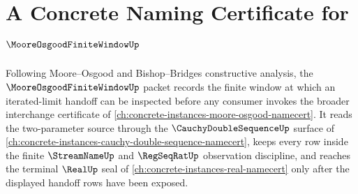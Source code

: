 \chapter{A Concrete Naming Certificate for $\MooreOsgoodFiniteWindowUp$}
\label{ch:concrete-instances-moore-osgood-finite-window-namecert}

Following Moore--Osgood and Bishop--Bridges constructive analysis, the $\MooreOsgoodFiniteWindowUp$ packet records the finite window at which an iterated-limit handoff can be inspected before any consumer invokes the broader interchange certificate of \autoref{ch:concrete-instances-moore-osgood-namecert}. It reads the two-parameter source through the $\CauchyDoubleSequenceUp$ surface of \autoref{ch:concrete-instances-cauchy-double-sequence-namecert}, keeps every row inside the finite $\StreamNameUp$ and $\RegSeqRatUp$ observation discipline, and reaches the terminal $\RealUp$ seal of \autoref{ch:concrete-instances-real-namecert} only after the displayed handoff rows have been exposed.

